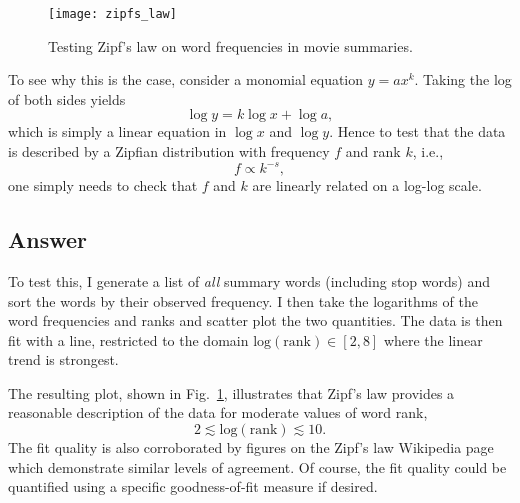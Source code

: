 \documentclass[aps,prc,reprint,amsmath]{revtex4-1}
\begin{document}
\begin{figure}
  \texttt{[image: zipfs\_law]}
  \caption{
    \label{fig:zipf}
    Testing Zipf's law on word frequencies in movie summaries.
  }
\end{figure}

To see why this is the case, consider a monomial equation $y = a x^k$. Taking the log of both sides yields
\begin{equation}
  \log y = k \log x + \log a,
\end{equation}
which is simply a linear equation in $\log x$ and $\log y$. Hence to test that the data is described by a Zipfian distribution with frequency $f$ and rank $k$, i.e.,
\begin{equation*}
  f \propto k^{-s}, 
\end{equation*}
one simply needs to check that $f$ and $k$ are linearly related on a log-log scale.

\subsection*{Answer}

To test this, I generate a list of \emph{all} summary words (including stop words) and sort the words by their observed frequency. I then take the logarithms of the word frequencies and ranks and scatter plot the two quantities. The data is then fit with a line, restricted to the domain $\mathrm{log(rank)} \in [2, 8]$ where the linear trend is strongest.

The resulting plot, shown in Fig.~\ref{fig:zipf}, illustrates that Zipf's law provides a reasonable description of the data for moderate values of word rank,
\begin{equation*}
  2 \lesssim \mathrm{log(rank)} \lesssim 10. 
\end{equation*}
The fit quality is also corroborated by figures on the Zipf's law Wikipedia page which demonstrate similar levels of agreement. Of course, the fit quality could be quantified using a specific goodness-of-fit measure if desired. 
\end{document}
